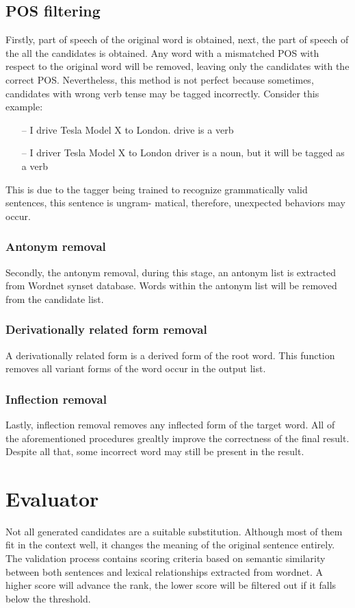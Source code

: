 \documentclass[12pt,oneside,openright,a4paper]{cpe-english-project}
\begin{document}
\subsection{POS filtering}
Firstly, part of speech of the original word is obtained, next, the part of speech of the all the candidates is obtained. Any word with a mismatched POS with respect to the original word will be removed, leaving only the candidates with the correct POS. Nevertheless, this method is not perfect because sometimes, candidates with wrong verb tense may be tagged incorrectly. Consider this example:


\begin{itemize}
\item[--]I drive Tesla Model X to London. drive is a verb
\item[--]I driver Tesla Model X to London driver is a noun, but it will be tagged as a verb
\end{itemize}
This is due to the tagger being trained to recognize grammatically valid sentences, this sentence is ungram- matical, therefore, unexpected behaviors may occur. 

\subsubsection{Antonym removal}
Secondly, the antonym removal, during this stage, an antonym list is extracted from Wordnet synset database. Words within the antonym list will be removed from the candidate list. 
\subsubsection{Derivationally related form removal}
A derivationally related form is a derived form of the root word. This function removes all variant forms of the word occur in the output list. 

\subsubsection{Inflection removal}
Lastly, inflection removal removes any inflected form of the target word. All of the aforementioned procedures grealtly improve the correctness of the final result. Despite all that, some incorrect word may still be present in the result. 


\section{Evaluator}
Not all generated candidates are a suitable substitution. Although most of them fit in the context well, it changes the meaning of the original sentence entirely. The validation process contains scoring criteria based on semantic similarity between both sentences and lexical relationships extracted from wordnet. A higher score will advance the rank, the lower score will be filtered out if it falls below the threshold.
\end{document}
